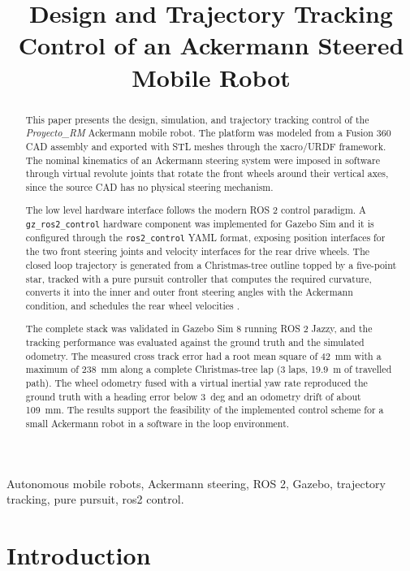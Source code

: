 \documentclass[conference]{IEEEtran}
\title{Design and Trajectory Tracking Control of an Ackermann Steered Mobile Robot}
\author{
  \IEEEauthorblockN{Ricardo Lorona}
    \IEEEauthorblockA{\textit{ESPOL, FIMCP} \textit{Mechatronics Engineering} \textit{Guayaquil, Ecuador}\\[2pt] {\ttfamily rlorona@espol.edu.ec}}
  \and
  \IEEEauthorblockN{Alejandro Malucin}
    \IEEEauthorblockA{\textit{ESPOL, FIMCP} \textit{Mechatronics Engineering} \textit{Guayaquil, Ecuador}}
  \and
  \IEEEauthorblockN{Augusto Pacheco}
    \IEEEauthorblockA{\textit{ESPOL, FIMCP} \textit{Mechatronics Engineering} \textit{Guayaquil, Ecuador}}
}
\begin{document}
\maketitle

\begin{abstract}
This paper presents the design, simulation, and trajectory tracking control of
the \textit{Proyecto\_RM} Ackermann mobile robot. The platform was modeled from
a Fusion 360 CAD assembly and exported with STL meshes through the xacro/URDF
framework. The nominal kinematics of an Ackermann steering system were imposed
in software through virtual revolute joints that rotate the front wheels around
their vertical axes, since the source CAD has no physical steering mechanism.

The low level hardware interface follows the modern ROS 2 control paradigm. A
\texttt{gz\_ros2\_control} hardware component was implemented for Gazebo Sim
and it is configured through the \texttt{ros2\_control} YAML format, exposing
position interfaces for the two front steering joints and velocity interfaces
for the rear drive wheels. The closed loop trajectory is generated from a
Christmas-tree outline topped by a five-point star, tracked with a pure pursuit
controller that computes the required curvature, converts it into the inner and
outer front steering angles with the Ackermann condition, and schedules the rear wheel
velocities \cite{icra_pure}.

The complete stack was validated in Gazebo Sim 8 running ROS 2 Jazzy, and the
tracking performance was evaluated against the ground truth and the simulated
odometry. The measured cross track error had a root mean square of 42~mm with a
maximum of 238~mm along a complete Christmas-tree lap (3 laps, 19.9~m of
travelled path). The wheel odometry fused with a virtual inertial yaw rate
reproduced the ground truth with a heading error below 3~deg and an odometry
drift of about 109~mm. The results support the feasibility of the implemented
control scheme for a small Ackermann robot in a software in the loop environment.
\end{abstract}

\begin{IEEEkeywords}
Autonomous mobile robots, Ackermann steering, ROS 2, Gazebo, trajectory tracking,
pure pursuit, ros2 control.
\end{IEEEkeywords}

\section{Introduction}
\label{sec:intro}
\end{document}
